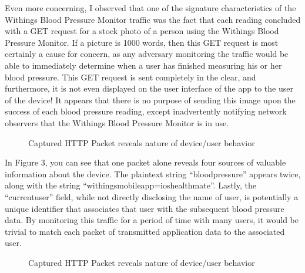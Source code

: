Even more concerning, I observed that one of the signature characteristics of the Withings Blood Pressure Monitor traffic was the fact that each reading concluded with a GET request for a stock photo of a person using the Withings Blood Pressure Monitor. If a picture is 1000 words, then this GET request is most certainly a cause for concern, as any adversary monitoring the traffic would be able to immediately determine when a user has finished measuring his or her blood pressure. This GET request is sent completely in the clear, and furthermore, it is not even displayed on the user interface of the app to the user of the device! It appears that there is no purpose of sending this image upon the success of each blood pressure reading, except inadvertently notifying network observers that the Withings Blood Pressure Monitor is in use. 

\begin{figure}
  \caption{Captured HTTP Packet reveals nature of device/user behavior}
  \centering
\end{figure}

In Figure 3, you can see that one packet alone reveals four sources of valuable information about the device. The plaintext string ``blood\textunderscore pressure'' appears twice, along with the string ``withings\textunderscore mobile\textunderscore app=ios\textunderscore healthmate''. Lastly, the ``current\textunderscore user'' field, while not directly disclosing the name of user, is potentially a unique identifier that associates that user with the subsequent blood pressure data. By monitoring this traffic for a period of time with many users, it would be trivial to match each packet of transmitted application data to the associated user. 

\begin{figure}
  \caption{Captured HTTP Packet reveals nature of device/user behavior}
  \centering
\end{figure}

